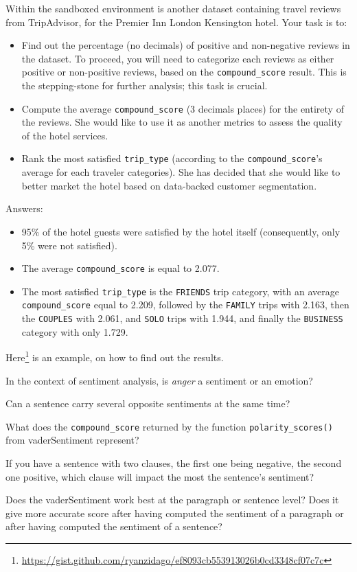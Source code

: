 	Within the sandboxed environment is another dataset containing travel reviews from TripAdvisor, for the Premier Inn London Kensington hotel. Your task is to:
	\begin{itemize}
		\item [1.] Find out the percentage (no decimals) of positive and non-negative reviews in the dataset. To proceed, you will need to categorize each reviews as either positive or non-positive reviews, based on the \verb|compound_score| result. This is the stepping-stone for further analysis; this task is crucial.
		\item [2.] Compute the average \verb|compound_score| (3 decimals places) for the entirety of the reviews. She would like to use it as another metrics to assess the quality of the hotel services.
		\item [3.] Rank the most satisfied \verb|trip_type| (according to the \verb|compound_score|'s average for each traveler categories). She has decided that she would like to better market the hotel based on data-backed customer segmentation.
	\end{itemize}

	Answers:
	\begin{itemize}
		\item [1.] 95\% of the hotel guests were satisfied by the hotel itself (consequently, only 5\% were not satisfied).
		\item [2.] The average \verb|compound_score| is equal to 2.077.
		\item [3.] The most satisfied \verb|trip_type| is the \verb|FRIENDS| trip category, with an average \verb|compound_score| equal to 2.209, followed by the \verb|FAMILY| trips with 2.163, then the \verb|COUPLES| with 2.061, and \verb|SOLO| trips with 1.944, and finally the \verb|BUSINESS| category with only 1.729.
	\end{itemize}
	Here\footnote{\href{https://gist.github.com/ryanzidago/ef8093cb553913026b0cd3348cf07c7c}{https://gist.github.com/ryanzidago/ef8093cb553913026b0cd3348cf07c7c}} is an example, on how to find out the results.

	\begin{testquestion}
		\item [1.] In the context of sentiment analysis, is \textit{anger} a sentiment or an emotion?
		\item [2.] Can a sentence carry several opposite sentiments at the same time?
		\item [3.] What does the \verb|compound_score| returned by the function \verb|polarity_scores()| from vaderSentiment represent?
		\item [4.] If you have a sentence with two clauses, the first one being negative, the second one positive, which clause will impact the most the sentence's sentiment?
		\item [5.] Does the vaderSentiment work best at the paragraph or sentence level? Does it give more accurate score after having computed the sentiment of a paragraph or after having computed the sentiment of a sentence?
	\end{testquestion}

